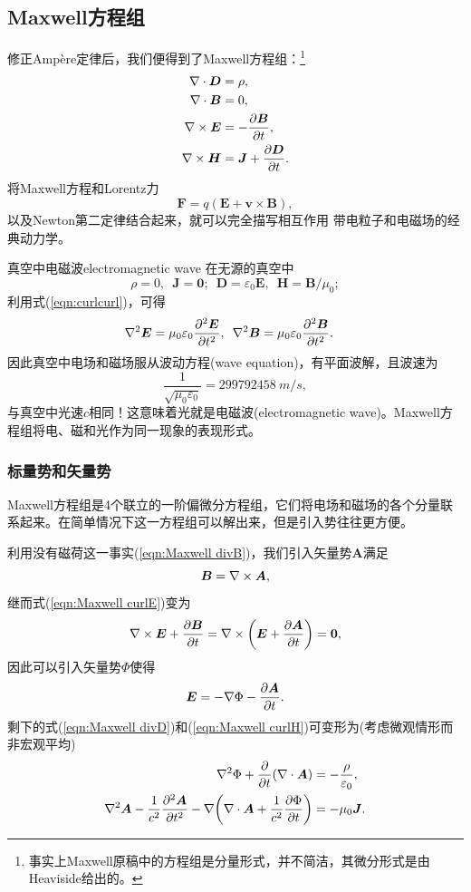 \subsection{Maxwell方程组}
修正Ampère定律后，我们便得到了Maxwell方程组：\footnote{事实上Maxwell原稿中的方程组是分量形式，并不简洁，其微分形式是由Heaviside给出的。}
\begin{align}
    \label{eqn:Maxwell divD}
    \div\bm D&=\rho,\\
    \label{eqn:Maxwell divB}
    \div\bm B&=0,\\
    \label{eqn:Maxwell curlE}
    \curl\bm E&=-\pv{\bm B}t,\\
    \label{eqn:Maxwell curlH}
    \curl\bm H&=\bm J+\pv{\bm D}t.
\end{align}
将Maxwell方程和Lorentz力
\begin{equation}
    \label{eqn:Lorentz}
    \bm F=q(\bm E+\bm v\times\bm B),
\end{equation}
以及Newton第二定律结合起来，就可以完全描写相互作用 带电粒子和电磁场的经典动力学。
\begin{example}{真空中电磁波}{electromagnetic wave}
    在无源的真空中
    \[
        \rho=0,\enspace\bm J=\bm 0;\enspace\bm D=\varepsilon_0\bm E,\enspace\bm H=\bm B/\mu_0;
    \]
    利用式(\ref{eqn:curlcurl})，可得
    \begin{align*}
        \lapla\bm E&%
        =\mu_0\varepsilon_0\pv[2]{\bm E}t,\enspace
        \lapla\bm B%
        =\mu_0\varepsilon_0\pv[2]{\bm B}t.
    \end{align*}
    因此真空中电场和磁场服从波动方程(wave equation)，有平面波解，且波速为
    \[
        \frac1{\sqrt{\mu_0\varepsilon_0}}=\SI{299 792 458}{m/s},
    \]
    与真空中光速$c$相同！这意味着光就是电磁波(electromagnetic wave)。Maxwell方程组将电、磁和光作为同一现象的表现形式。
\end{example}
\subsubsection{标量势和矢量势}
Maxwell方程组是4个联立的一阶偏微分方程组，它们将电场和磁场的各个分量联系起来。在简单情况下这一方程组可以解出来，但是引入势往往更方便。

利用没有磁荷这一事实(\ref{eqn:Maxwell divB})，我们引入矢量势$\bm A$满足 
\begin{equation}
    \label{eqn:curlA}
    \bm B=\nabla\times\bm A,
\end{equation}
继而式(\ref{eqn:Maxwell curlE})变为 
\[
    \curl\bm E+\pv{\bm B}t=\curl\biggkh{\bm E+\pv{\bm A}t}=\bm 0,
\]
因此可以引入矢量势$\Phi$使得
\begin{equation}
    \label{eqn:-nablaPhi-pApt}
    \bm E=-\nabla\Phi-\frac{\partial^{\;\!\!}\bm A}{\partial t^{\;\!\!}}.
\end{equation}
剩下的式(\ref{eqn:Maxwell divD})和(\ref{eqn:Maxwell curlH})可变形为(考虑微观情形而非宏观平均)
\begin{align}
    \lapla\Phi+\pp t(\div\bm A)&=-\frac\rho{\varepsilon_0},\\
    \lapla\bm A-\frac1{c^2}\pv[2]{\bm A}t-\nabla\biggkh{\div\bm A+\frac1{c^2}\pv\Phi t}&=-\mu_0\bm J.
\end{align}
